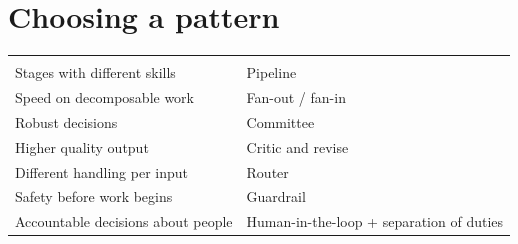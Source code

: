 \section{Choosing a pattern}

\begin{center}
\small
\begin{tabularx}{\linewidth}{@{}L{3.6cm}Y@{}}
\toprule
{} & \\
\goldrule
Stages with different skills & Pipeline\\
Speed on decomposable work & Fan-out / fan-in\\
Robust decisions & Committee\\
Higher quality output & Critic and revise\\
Different handling per input & Router\\
Safety before work begins & Guardrail\\
Accountable decisions about people & Human-in-the-loop + separation of duties\\
\bottomrule
\end{tabularx}
\end{center}
